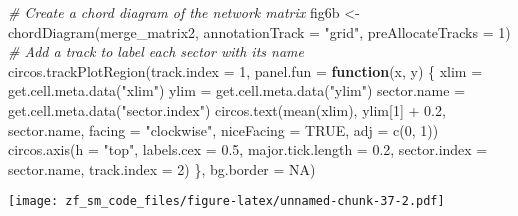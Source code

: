 \documentclass[
]{article}
\newenvironment{Shaded}{\begin{snugshade}}{\end{snugshade}}
\newcommand{\AttributeTok}[1]{\textcolor[rgb]{0.77,0.63,0.00}{#1}}
\newcommand{\CommentTok}[1]{\textcolor[rgb]{0.56,0.35,0.01}{\textit{#1}}}
\newcommand{\ConstantTok}[1]{\textcolor[rgb]{0.00,0.00,0.00}{#1}}
\newcommand{\ControlFlowTok}[1]{\textcolor[rgb]{0.13,0.29,0.53}{\textbf{#1}}}
\newcommand{\DecValTok}[1]{\textcolor[rgb]{0.00,0.00,0.81}{#1}}
\newcommand{\FloatTok}[1]{\textcolor[rgb]{0.00,0.00,0.81}{#1}}
\newcommand{\FunctionTok}[1]{\textcolor[rgb]{0.00,0.00,0.00}{#1}}
\newcommand{\NormalTok}[1]{#1}
\newcommand{\OtherTok}[1]{\textcolor[rgb]{0.56,0.35,0.01}{#1}}
\newcommand{\SpecialCharTok}[1]{\textcolor[rgb]{0.00,0.00,0.00}{#1}}
\newcommand{\StringTok}[1]{\textcolor[rgb]{0.31,0.60,0.02}{#1}}
\begin{document}
\begin{Shaded}
\begin{Highlighting}[]
\CommentTok{\# Create a chord diagram of the network matrix}
\NormalTok{fig6b }\OtherTok{\textless{}{-}} \FunctionTok{chordDiagram}\NormalTok{(merge\_matrix2, }\AttributeTok{annotationTrack =} \StringTok{"grid"}\NormalTok{, }\AttributeTok{preAllocateTracks =} \DecValTok{1}\NormalTok{)}
\CommentTok{\# Add a track to label each sector with its name}
\FunctionTok{circos.trackPlotRegion}\NormalTok{(}\AttributeTok{track.index =} \DecValTok{1}\NormalTok{, }\AttributeTok{panel.fun =} \ControlFlowTok{function}\NormalTok{(x, y) \{}
\NormalTok{  xlim }\OtherTok{=} \FunctionTok{get.cell.meta.data}\NormalTok{(}\StringTok{"xlim"}\NormalTok{)}
\NormalTok{  ylim }\OtherTok{=} \FunctionTok{get.cell.meta.data}\NormalTok{(}\StringTok{"ylim"}\NormalTok{)}
\NormalTok{  sector.name }\OtherTok{=} \FunctionTok{get.cell.meta.data}\NormalTok{(}\StringTok{"sector.index"}\NormalTok{)}
  \FunctionTok{circos.text}\NormalTok{(}\FunctionTok{mean}\NormalTok{(xlim), ylim[}\DecValTok{1}\NormalTok{] }\SpecialCharTok{+} \FloatTok{0.2}\NormalTok{, sector.name, }\AttributeTok{facing =} \StringTok{"clockwise"}\NormalTok{, }\AttributeTok{niceFacing =} \ConstantTok{TRUE}\NormalTok{, }\AttributeTok{adj =} \FunctionTok{c}\NormalTok{(}\DecValTok{0}\NormalTok{, }\DecValTok{1}\NormalTok{))}
  \FunctionTok{circos.axis}\NormalTok{(}\AttributeTok{h =} \StringTok{"top"}\NormalTok{, }\AttributeTok{labels.cex =} \FloatTok{0.5}\NormalTok{, }\AttributeTok{major.tick.length =} \FloatTok{0.2}\NormalTok{, }\AttributeTok{sector.index =}\NormalTok{ sector.name, }\AttributeTok{track.index =} \DecValTok{2}\NormalTok{)}
\NormalTok{\}, }\AttributeTok{bg.border =} \ConstantTok{NA}\NormalTok{)}
\end{Highlighting}
\end{Shaded}

\texttt{[image: zf\_sm\_code\_files/figure-latex/unnamed-chunk-37-2.pdf]}
\end{document}
